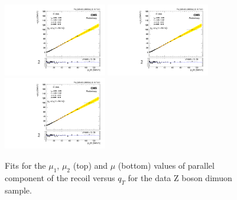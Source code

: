 \begin{figure}
\begin{center}
\includegraphics[width=0.4\textwidth]{Figures/WBoson/Analysis/Correction/Recoil/RecoilFitsqT/Data/fitPFu1mean1.pdf}
\includegraphics[width=0.4\textwidth]{Figures/WBoson/Analysis/Correction/Recoil/RecoilFitsqT/Data/fitPFu1mean2.pdf} \\
\includegraphics[width=0.4\textwidth]{Figures/WBoson/Analysis/Correction/Recoil/RecoilFitsqT/Data/fitPFu1mean.pdf}
\caption{Fits for the $\mu_{1}$,  $\mu_{2}$ (top) and $\mu$ (bottom) values of parallel component of the recoil versus $q_{T}$ for the data Z boson dimuon sample.}
\label{fig:figU1RecoilScaleFit_data}
\end{center}
\end{figure}

